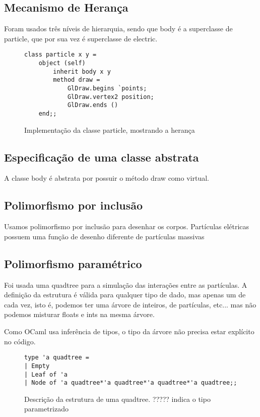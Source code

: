 \documentclass[a4paper,10pt]{article}
\begin{document}
\subsection{Mecanismo de Herança}
	Foram usados três níveis de hierarquia, sendo que body é a superclasse de particle, que por sua vez é superclasse de electric.

	\begin{figure}[H]
	\centering	
	\begin{lstlisting}
class particle x y =
	object (self)
		inherit body x y
		method draw =
			GlDraw.begins `points;
			GlDraw.vertex2 position;
			GlDraw.ends ()
	end;;
	\end{lstlisting}
	\caption{Implementação da classe particle, mostrando a herança}
\end{figure}

\subsection{Especificação de uma classe abstrata}
	A classe body é abstrata por possuir o método draw como virtual.

\subsection{Polimorfismo por inclusão}
	
	Usamos polimorfismo por inclusão para desenhar os corpos. Partículas elétricas possuem uma função de desenho diferente de partículas massivas
	
\subsection{Polimorfismo paramétrico}
	
		Foi usada uma quadtree para a simulação das interações entre as partículas. A definição da estrutura é válida para qualquer tipo de dado, mas apenas um de cada vez, isto é, podemos ter uma árvore de inteiros, de partículas, etc... mas não podemos misturar floats e ints na mesma árvore.
		
		Como OCaml usa inferência de tipos, o tipo da árvore não precisa estar explícito no código.
		
	\begin{figure}[H]
	\centering	
	\begin{lstlisting}
type 'a quadtree =
| Empty
| Leaf of 'a
| Node of 'a quadtree*'a quadtree*'a quadtree*'a quadtree;;
	\end{lstlisting}
	\caption{Descrição da estrutura de uma quadtree. ????? indica o tipo parametrizado }
	\end{figure}
	
\end{document}
